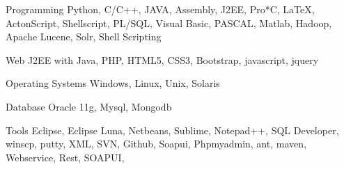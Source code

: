 


\begin{cvskills}


\cvskill
{Programming} %
{Python, C/C++, JAVA, Assembly, J2EE,  Pro*C,  LaTeX, ActonScript, Shellscript, PL/SQL, Visual Basic,
 PASCAL, Matlab, Hadoop, Apache Lucene, Solr, Shell Scripting } %


\cvskill
{Web} %
{J2EE with Java, PHP, HTML5, CSS3, Bootstrap, javascript, jquery } %


\cvskill
{Operating Systems} %
{Windows, Linux, Unix, Solaris} %


\cvskill
{Database} %
{Oracle 11g, Mysql, Mongodb } %


\cvskill
{Tools} %
{Eclipse, Eclipse Luna, Netbeans, Sublime, Notepad++, SQL Developer, winscp, putty, XML, SVN, Github, Soapui, Phpmyadmin, ant, maven, Webservice, Rest, SOAPUI,  } %



\end{cvskills}